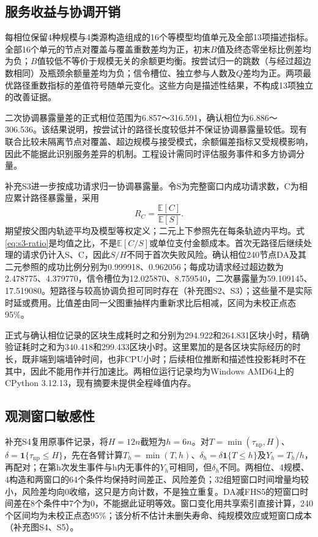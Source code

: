\documentclass[UTF8,a4paper,twocolumn,fontset=none,zihao=5]{ctexart}
\begin{document}
\subsection{服务收益与协调开销}

每相位保留4种规模与4类源构造组成的16个等模型均值单元及全部13项描述指标。全部16个单元的节点对覆盖与覆盖重数差均为正，初末$B$值及终态零坐标比例差均为负；$B$值较低不等价于规模无关的余额更均衡。按尝试归一的跳数（与经过超边数相同）及瓶颈余额量差均为负；信令槽位、独立参与人数及$Q$差均为正。两项最优路径重数指标的差值符号随单元变化。这些方向是描述性结果，不构成13项独立的改善证据。


二次协调暴露量差的正式相位范围为6.857～316.591，确认相位为6.886～306.536。该结果说明，按尝试计的路径长度较低并不保证协调暴露量较低。现有联合比较未隔离节点对覆盖、超边规模与接受模式，余额偏差指标又受规模影响，因此不能据此识别服务差异的机制。工程设计需同时评估服务事件和多方协调分量。



补充S3进一步按成功请求归一协调暴露量。令S为完整窗口内成功请求数，C为相应累计路径暴露量，采用
\begin{equation}
R_C=\frac{\mathbb E[C]}{\mathbb E[S]}.
\label{eq:s3-ratio}
\end{equation}
期望按父图内轨迹平均及模型等权定义；二元上下参照先在每条轨迹内平均。式\ref{eq:s3-ratio}是均值之比，不是$\mathbb E[C/S]$或单位支付金额成本。首次无路径后继续处理的请求仍计入S、C，因此$S/H$不同于首次失败风险。确认相位240节点DA及其二元参照的成功比例分别为0.999918、0.962056；每成功请求经过超边数为2.478775、4.379770，信令槽位为12.025870、8.759540，二次暴露量为59.109145、17.519080。短路径与较高协调负担可同时存在（补充图S2、S3）；这些量不是实际时延或费用。比值差由同一父图重抽样内重新求比后相减，区间为未校正点态95\%。


正式与确认相位记录的区块生成耗时之和分别为294.922和264.831区块小时，精确验证耗时之和为340.418和299.433区块小时。这里累加的是各区块实际经历的时长，既非端到端墙钟时间，也非CPU小时；后续相位推断和描述性投影耗时不在其中，因此不能用作并行加速比。两相位运行记录均为Windows AMD64上的CPython 3.12.13，现有摘要未提供全程峰值内存。



\subsection{观测窗口敏感性}

补充S4复用原事件记录，将$H=12n$截短为$h=6n$。对$T=\min(\tau_{\mathrm{np}},H)$、$\delta=\mathbf1\{\tau_{\mathrm{np}}\leq H\}$，先在各臂计算$T_h=\min(T,h)$、$\delta_h=\delta\mathbf1\{T\leq h\}$及$Y_h=T_h/h$，再配对；在第h次发生事件与h内无事件的$Y_h$可相同，但$\delta_h$不同。两相位、4规模、4构造和两窗口的64个条件均保持时间差正、风险差负；32组短窗口时间增量均较小，风险差均向0收缩，这只是方向计数，不是独立重复。DA减FHS5的短窗口时间差在8个条件中7个为0，不能据此证明等效。窗口变化用共享索引直接计算，240个区间均为未校正点态95\%；该分析不估计未删失寿命、纯规模效应或短窗口成本（补充图S4、S5）。
\end{document}
